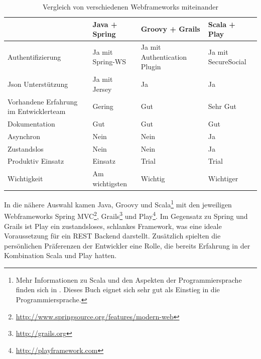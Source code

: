 \begin{table}[ht]
  \begin{tabularx}{\textwidth}{|p{}|p{}|p{}|p{}|}
    \hline
    ~                                      & Java + Spring    & Groovy + Grails              & Scala + Play        \\\hline
    Authentifizierung                      & Ja mit Spring-WS & Ja mit Authentication Plugin & Ja mit SecureSocial \\\hline
    Json Unterstützung                     & Ja mit Jersey    & Ja                           & Ja                  \\\hline
    Vorhandene Erfahrung im Entwicklerteam & Gering           & Gut                          & Sehr Gut            \\\hline
    Dokumentation                          & Gut              & Gut                          & Gut                 \\\hline
    Asynchron                              & Nein             & Nein                         & Ja                  \\\hline
    Zustandslos                            & Nein             & Nein                         & Ja                  \\\hline
    Produktiv Einsatz                      & Einsatz          & Trial                        & Trial               \\\hline
    Wichtigkeit                            & Am wichtigsten   & Wichtig                      & Wichtiger           \\\hline
  \end{tabularx}
  \caption {Vergleich von verschiedenen Webframeworks miteinander}
  \label{tab:FrameWorkVergleich}
\end{table}

In die nähere Auswahl kamen Java, Groovy und Scala\footnote{Mehr Informationen zu Scala und den Aspekten der Programmiersprache finden sich in \cite{scala-by-example}. Dieses Buch eignet sich sehr gut als Einstieg in die Programmiersprache.} mit den jeweiligen Webframeworks Spring MVC\footnote{\url{http://www.springsource.org/features/modern-web}}, Grails\footnote{\url{http://grails.org}} und Play\footnote{\url{http://playframework.com}}. Im Gegensatz zu Spring und Grails ist Play ein zustandsloses, schlankes Framework, was eine ideale Voraussetzung für ein REST Backend darstellt. Zusätzlich spielten die persönlichen Präferenzen der Entwickler eine Rolle, die bereits Erfahrung in der Kombination Scala und Play hatten.

